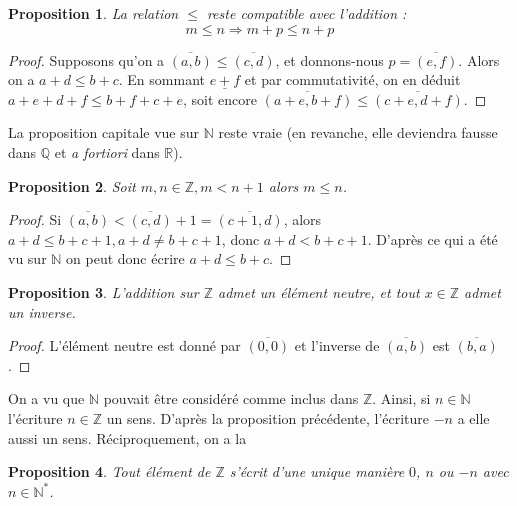 \documentclass[french]{book}
\theoremstyle{plain}
\newtheorem{prop}{Proposition}[chapter]
\theoremstyle{definition}
\theoremstyle{remark}
\begin{document}
\begin{prop}
	La relation $\leqslant$ reste compatible avec l'addition : $$m \leqslant n \Rightarrow m+p \leqslant n+p$$
\end{prop}
\begin{proof}
	Supposons qu'on a $\overline{(a,b)} \leqslant \overline{(c,d)}$, et donnons-nous $p = \overline{(e,f)}$. Alors on a $a+d \leqslant b+c$. En sommant $\underline{e+f}$ et par commutativité, on en déduit $a+e+d+f \leqslant b+f+c+e$, soit encore $\overline{(a+e,b+f)} \leqslant \overline{(c+e,d+f)}$.
\end{proof}
La proposition capitale vue sur $\mathbb{N}$ reste vraie (en revanche, elle deviendra fausse dans $\mathbb{Q}$ et \textit{a fortiori} dans $\mathbb{R}$).
\begin{prop}
	Soit $m,n \in \mathbb{Z}, m < n+1$ alors $m \leqslant n$.
\end{prop}
\begin{proof}
	Si $\overline{(a,b)} < \overline{(c,d)} + 1 = \overline{(c+1,d)}$, alors $a+d \leqslant b+c+1, a+d \neq b+c+1$, donc $a+d < b+c+1$. D'après ce qui a été vu sur $\mathbb{N}$ on peut donc écrire $a+d \leqslant b+c$.
\end{proof}
\begin{prop}
	L'addition sur $\mathbb{Z}$ admet un élément neutre, et tout $x \in \mathbb{Z}$ admet un inverse.
\end{prop}
\begin{proof}
	L'élément neutre est donné par $\overline{(0,0)}$ et l'inverse de $\overline{(a,b)}$ est $\overline{(b,a)}$.
\end{proof}
On a vu que $\mathbb{N}$ pouvait être considéré comme inclus dans $\mathbb{Z}$. Ainsi, si $n \in \mathbb{N}$ l'écriture $n \in \mathbb{Z}$ un sens. D'après la proposition précédente, l'écriture $-n$ a elle aussi un sens. Réciproquement, on a la
\begin{prop}
	Tout élément de $\mathbb{Z}$ s'écrit d'une unique manière $0$, $n$ ou $-n$ avec $n \in \mathbb{N}^*$.
\end{prop}
\end{document}
